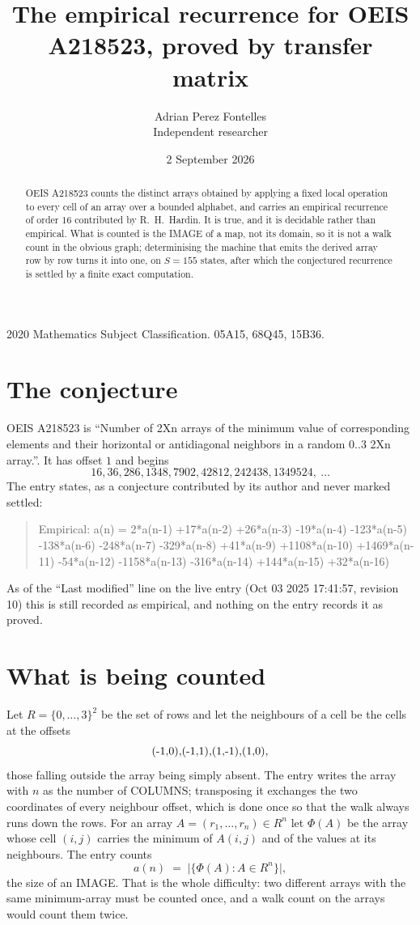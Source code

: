 \documentclass[11pt,a4paper]{article}
\title{The empirical recurrence for OEIS A218523, proved by transfer matrix}
\author{Adrian Perez Fontelles\\ \small Independent researcher}
\date{2 September 2026}
\theoremstyle{plain}
\theoremstyle{definition}
\begin{document}
\maketitle

\begin{abstract}
OEIS A218523 counts the distinct arrays obtained by applying a fixed local operation to every cell
of an array over a bounded alphabet, and carries an empirical recurrence of order $16$
contributed by R.~H.~Hardin. It is true, and it is decidable rather than empirical. What is
counted is the IMAGE of a map, not its domain, so it is not a walk count in the obvious graph;
determinising the machine that emits the derived array row by row turns it into one, on
$S=155$ states, after which the conjectured recurrence is settled by a finite exact
computation.
\end{abstract}

\noindent\small 2020 Mathematics Subject Classification. 05A15, 68Q45, 15B36.\normalsize

\section{The conjecture}

OEIS A218523 is ``Number of 2Xn arrays of the minimum value of corresponding elements and their horizontal or antidiagonal neighbors in a random 0..3 2Xn array.''. It has offset $1$ and begins
\[
16, 36, 286, 1348, 7902, 42812, 242438, 1349524,\ \dots
\]
The entry states, as a conjecture contributed by its author and never marked settled:
\begin{quote}
Empirical: a(n) = 2*a(n-1) +17*a(n-2) +26*a(n-3) -19*a(n-4) -123*a(n-5) -138*a(n-6) -248*a(n-7) -329*a(n-8) +41*a(n-9) +1108*a(n-10) +1469*a(n-11) -54*a(n-12) -1158*a(n-13) -316*a(n-14) +144*a(n-15) +32*a(n-16)
\end{quote}
As of the ``Last modified'' line on the live entry (Oct 03 2025 17:41:57, revision 10) this is still
recorded as empirical, and nothing on the entry records it as proved.

\section{What is being counted}

Let $R=\{0,\dots,3\}^{2}$ be the set of rows and let the neighbours of
a cell be the cells at the offsets
\[
$(-1,0)$, $(-1,1)$, $(1,-1)$, $(1,0)$,
\]
those falling outside the array being simply absent. The entry writes the array with $n$ as the number of COLUMNS; transposing it exchanges the two coordinates of every neighbour offset, which is done once so that the walk always runs down the rows. For an array
$A=(r_1,\dots,r_n)\in R^n$ let $\Phi(A)$ be the array whose cell $(i,j)$ carries the
minimum of $A(i,j)$ and of the values at its neighbours. The entry counts
\[
a(n)\;=\;\bigl|\{\Phi(A):A\in R^n\}\bigr| ,
\]
the size of an IMAGE. That is the whole difficulty: two different arrays with the same
minimum-array must be counted once, and a walk count on the arrays would count them twice.
\end{document}
